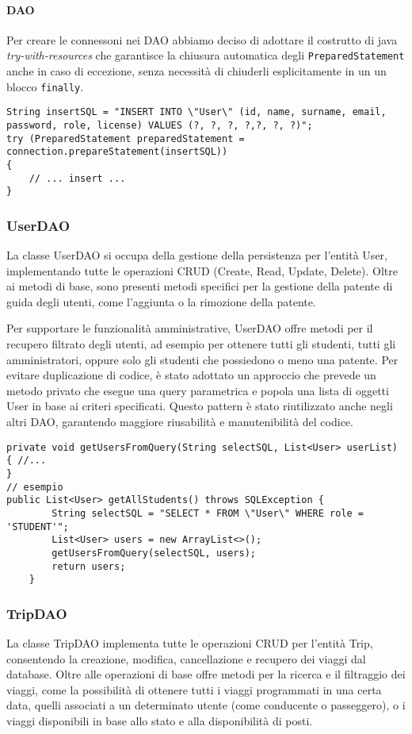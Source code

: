 \paragraph{DAO} Per creare le connessoni nei DAO abbiamo deciso di adottare il costrutto di java \textit{try-with-resources} che garantisce la chiusura automatica degli \texttt{PreparedStatement} anche in caso di eccezione, senza necessità di chiuderli esplicitamente in un un blocco \texttt{finally}.
\begin{lstlisting}[style=java, caption={Esempio di uso di try-with-resources per la connessione nel metodo insertUser di UserDAO}]
String insertSQL = "INSERT INTO \"User\" (id, name, surname, email, password, role, license) VALUES (?, ?, ?, ?,?, ?, ?)";
try (PreparedStatement preparedStatement = connection.prepareStatement(insertSQL))
{
    // ... insert ...
}
\end{lstlisting}
\subsubsection{UserDAO}
La classe UserDAO si occupa della gestione della persistenza per l'entità User, implementando tutte le operazioni CRUD (Create, Read, Update, Delete). Oltre ai metodi di base, sono presenti metodi specifici per la gestione della patente di guida degli utenti, come l'aggiunta o la rimozione della patente.

Per supportare le funzionalità amministrative, UserDAO offre metodi per il recupero filtrato degli utenti, ad esempio per ottenere tutti gli studenti, tutti gli amministratori, oppure solo gli studenti che possiedono o meno una patente. Per evitare duplicazione di codice, è stato adottato un approccio che prevede un metodo privato che esegue una query parametrica e popola una lista di oggetti User in base ai criteri specificati. Questo pattern è stato riutilizzato anche negli altri DAO, garantendo maggiore riusabilità e manutenibilità del codice.
\begin{lstlisting}[style=java, caption={Metodo per ottenere tutti gli User che soddisfano alcuni criteri}]
private void getUsersFromQuery(String selectSQL, List<User> userList) { //...
}
// esempio
public List<User> getAllStudents() throws SQLException {
        String selectSQL = "SELECT * FROM \"User\" WHERE role = 'STUDENT'";
        List<User> users = new ArrayList<>();
        getUsersFromQuery(selectSQL, users);
        return users;
    }
\end{lstlisting}
\subsubsection{TripDAO}
La classe TripDAO implementa tutte le operazioni CRUD per l'entità Trip, consentendo la creazione, modifica, cancellazione e recupero dei viaggi dal database. Oltre alle operazioni di base offre metodi per la ricerca e il filtraggio dei viaggi, come la possibilità di ottenere tutti i viaggi programmati in una certa data, quelli associati a un determinato utente (come conducente o passeggero), o i viaggi disponibili in base allo stato e alla disponibilità di posti.
